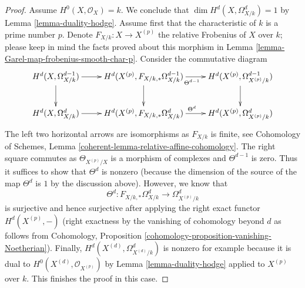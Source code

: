 \begin{proof}
\medskip\noindent
Assume $H^0(X, \mathcal{O}_X) = k$. We conclude that
$\dim H^d(X, \Omega^d_{X/k}) = 1$ by Lemma \ref{lemma-duality-hodge}.
Assume first that the characteristic of $k$ is a prime number $p$.
Denote $F_{X/k} : X \to X^{(p)}$ the relative Frobenius of $X$ over $k$;
please keep in mind the facts proved about this morphism in
Lemma \ref{lemma-Garel-map-frobenius-smooth-char-p}.
Consider the commutative diagram
$$
\xymatrix{
H^d(X, \Omega^{d - 1}_{X/k}) \ar[d] \ar[r] &
H^d(X^{(p)}, F_{X/k, *}\Omega^{d - 1}_{X/k}) \ar[d] \ar[r]_{\Theta^{d - 1}} &
H^d(X^{(p)}, \Omega^{d - 1}_{X^{(p)}/k}) \ar[d] \\
H^d(X, \Omega^d_{X/k}) \ar[r] &
H^d(X^{(p)}, F_{X/k, *}\Omega^d_{X/k}) \ar[r]^{\Theta^d} &
H^d(X^{(p)}, \Omega^d_{X^{(p)}/k})
}
$$
The left two horizontal arrows are isomorphisms as $F_{X/k}$ is finite, see
Cohomology of Schemes, Lemma \ref{coherent-lemma-relative-affine-cohomology}.
The right square commutes as $\Theta_{X^{(p)}/X}$ is a morphism of
complexes and $\Theta^{d - 1}$ is zero. Thus it suffices to show that
$\Theta^d$ is nonzero (because the dimension of the source of the map
$\Theta^d$ is $1$ by the discussion above). However, we know that
$$
\Theta^d : F_{X/k, *}\Omega^d_{X/k} \to \Omega^d_{X^{(p)}/k}
$$
is surjective and hence surjective after applying the right exact
functor $H^d(X^{(p)}, -)$ (right exactness by the vanishing of cohomology
beyond $d$ as follows from
Cohomology, Proposition \ref{cohomology-proposition-vanishing-Noetherian}).
Finally, $H^d(X^{(d)}, \Omega^d_{X^{(d)}/k})$ is nonzero for example because
it is dual to $H^0(X^{(d)}, \mathcal{O}_{X^{(p)}})$ by
Lemma \ref{lemma-duality-hodge} applied to $X^{(p)}$ over $k$.
This finishes the proof in this case.


\end{proof}

